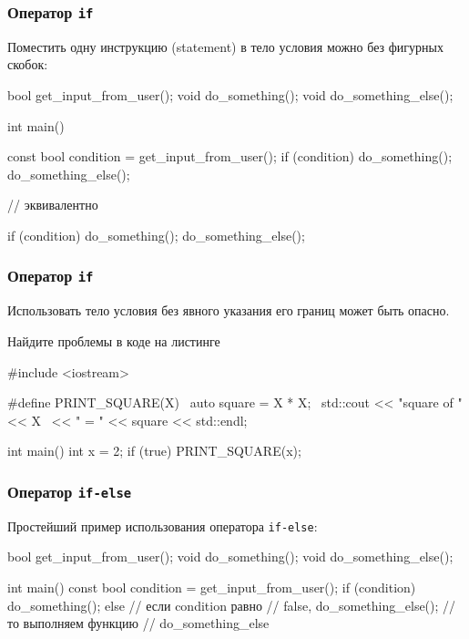 \documentclass[compress, 8pt]{beamer}
\begin{document}
\begin{frame}[fragile]

    \frametitle{Оператор \texttt{if}}

    Поместить одну инструкцию (statement) в тело условия можно
    без фигурных скобок:

    \begin{myinplacelisting}[minted language=cpp]
bool get_input_from_user();
void do_something();
void do_something_else();

int main() {
    const bool condition = get_input_from_user();
    if (condition)
        do_something();
        do_something_else();

    // эквивалентно

    if (condition) {
        do_something();
    }
    do_something_else();
}
    \end{myinplacelisting}

\end{frame}

\begin{frame}[fragile]

    \frametitle{Оператор \texttt{if}}

    Использовать тело условия без явного указания его
    границ может быть опасно.

    \begin{task}
        Найдите проблемы в коде на листинге
    \end{task}

    \begin{myinplacelisting}[minted language=cpp]
#include <iostream>

#define PRINT_SQUARE(X)                 \
    auto square = X * X;                \
    std::cout << "square of " << X      \
        << " = " << square << std::endl;

int main() {
    int x = 2;
    if (true)
        PRINT_SQUARE(x);
}
    \end{myinplacelisting}

\end{frame}

\begin{frame}[fragile]

    \frametitle{Оператор \texttt{if-else}}

    Простейший пример использования оператора \verb|if-else|:

    \begin{myinplacelisting}[minted language=cpp]
bool get_input_from_user();
void do_something();
void do_something_else();

int main() {
    const bool condition = get_input_from_user();
    if (condition) {
        do_something();
    }
    else {                      // если condition равно
                                // false,
        do_something_else();    // то выполняем функцию
                                // do_something_else
    }
}
    \end{myinplacelisting}

\end{frame}
\end{document}
